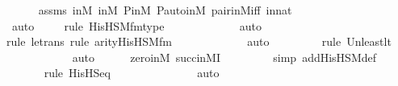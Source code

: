 \begin{isabellebody}
\ \ \ \ \isamarkupfalse%
\ assms\ {\isasymF}{\isacharunderscore}{\kern0pt}in{\isacharunderscore}{\kern0pt}M\ {\isasymG}{\isacharunderscore}{\kern0pt}in{\isacharunderscore}{\kern0pt}M\ P{\isacharunderscore}{\kern0pt}in{\isacharunderscore}{\kern0pt}M\ P{\isacharunderscore}{\kern0pt}auto{\isacharunderscore}{\kern0pt}in{\isacharunderscore}{\kern0pt}M\ pair{\isacharunderscore}{\kern0pt}in{\isacharunderscore}{\kern0pt}M{\isacharunderscore}{\kern0pt}iff\ innat\isanewline
\ \ \ \ \ \ \ \ \ \ \ \ \ \ \ \ \ \ \isamarkupfalse%
\ auto{\isacharbrackleft}{\kern0pt}{}{\isacharbrackright}{\kern0pt}\isanewline
\ \ \ \ \isamarkupfalse%
{\isacharparenleft}{\kern0pt}rule\ His{\isacharunderscore}{\kern0pt}HS{\isacharunderscore}{\kern0pt}M{\isacharunderscore}{\kern0pt}fm{\isacharunderscore}{\kern0pt}type{\isacharparenright}{\kern0pt}\isanewline
\ \ \ \ \ \ \ \ \ \ \ \isamarkupfalse%
\ auto{\isacharbrackleft}{\kern0pt}{}{\isacharbrackright}{\kern0pt}\isanewline
\ \ \ \ \ \ \ \ \isamarkupfalse%
{\isacharparenleft}{\kern0pt}rule\ le{\isacharunderscore}{\kern0pt}trans{\isacharcomma}{\kern0pt}\ rule\ arity{\isacharunderscore}{\kern0pt}His{\isacharunderscore}{\kern0pt}HS{\isacharunderscore}{\kern0pt}M{\isacharunderscore}{\kern0pt}fm{\isacharparenright}{\kern0pt}\isanewline
\ \ \ \ \ \ \ \ \ \ \ \isamarkupfalse%
\ auto{\isacharbrackleft}{\kern0pt}{}{\isacharbrackright}{\kern0pt}\isanewline
\ \ \ \ \ \ \ \ \isamarkupfalse%
{\isacharparenleft}{\kern0pt}rule\ Un{\isacharunderscore}{\kern0pt}least{\isacharunderscore}{\kern0pt}lt{\isacharparenright}{\kern0pt}{\isacharplus}{\kern0pt}\isanewline
\ \ \ \ \ \ \ \ \ \ \isamarkupfalse%
\ auto{\isacharbrackleft}{\kern0pt}{}{\isacharbrackright}{\kern0pt}\isanewline
\ \ \ \ \isamarkupfalse%
\ zero{\isacharunderscore}{\kern0pt}in{\isacharunderscore}{\kern0pt}M\ succ{\isacharunderscore}{\kern0pt}in{\isacharunderscore}{\kern0pt}MI\ \isanewline
\ \ \ \ \ \ \ \isamarkupfalse%
{\isacharparenleft}{\kern0pt}simp\ add{\isacharcolon}{\kern0pt}His{\isacharunderscore}{\kern0pt}HS{\isacharunderscore}{\kern0pt}M{\isacharunderscore}{\kern0pt}def{\isacharparenright}{\kern0pt}\isanewline
\ \ \ \ \ \ \isamarkupfalse%
{\isacharparenleft}{\kern0pt}rule\ His{\isacharunderscore}{\kern0pt}HS{\isacharunderscore}{\kern0pt}eq{\isacharparenright}{\kern0pt}\isanewline
\ \ \ \ \ \ \ \ \ \ \ \ \ \isamarkupfalse%
\ auto{\isacharbrackleft}{\kern0pt}{}{\isacharbrackright}{\kern0pt}\isanewline

\end{isabellebody}
